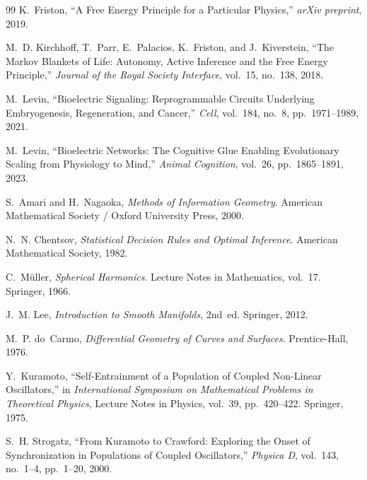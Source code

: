 \documentclass[11pt,fleqn]{book}
\numberwithin{equation}{chapter}
\theoremstyle{plain}
\theoremstyle{definition}
\theoremstyle{remark}
\begin{document}
\begin{thebibliography}{99}
K.~Friston, ``A Free Energy Principle for a Particular Physics,'' \emph{arXiv preprint}, 2019.

M.~D. Kirchhoff, T.~Parr, E.~Palacios, K.~Friston, and J.~Kiverstein, ``The Markov Blankets of Life: Autonomy, Active Inference and the Free Energy Principle,'' \emph{Journal of the Royal Society Interface}, vol.~15, no.~138, 2018.

M.~Levin, ``Bioelectric Signaling: Reprogrammable Circuits Underlying Embryogenesis, Regeneration, and Cancer,'' \emph{Cell}, vol.~184, no.~8, pp.~1971--1989, 2021.

M.~Levin, ``Bioelectric Networks: The Cognitive Glue Enabling Evolutionary Scaling from Physiology to Mind,'' \emph{Animal Cognition}, vol.~26, pp.~1865--1891, 2023.


S.~Amari and H.~Nagaoka, \emph{Methods of Information Geometry}. American Mathematical Society / Oxford University Press, 2000.

N.~N. Chentsov, \emph{Statistical Decision Rules and Optimal Inference}. American Mathematical Society, 1982.

C.~Müller, \emph{Spherical Harmonics}. Lecture Notes in Mathematics, vol.~17. Springer, 1966.

J.~M. Lee, \emph{Introduction to Smooth Manifolds}, 2nd~ed. Springer, 2012.

M.~P. do~Carmo, \emph{Differential Geometry of Curves and Surfaces}. Prentice-Hall, 1976.

Y.~Kuramoto, ``Self-Entrainment of a Population of Coupled Non-Linear Oscillators,'' in \emph{International Symposium on Mathematical Problems in Theoretical Physics}, Lecture Notes in Physics, vol.~39, pp.~420--422. Springer, 1975.

S.~H. Strogatz, ``From Kuramoto to Crawford: Exploring the Onset of Synchronization in Populations of Coupled Oscillators,'' \emph{Physica D}, vol.~143, no.~1--4, pp.~1--20, 2000.


\end{thebibliography}
\end{document}
